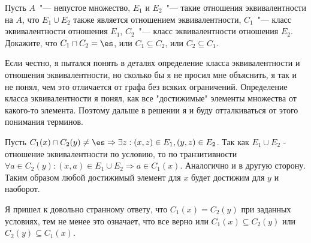 \documentclass[11pt]{article}
\begin{document}
	\p Пусть $A$~"--- непустое множество,  $E_1$ и $E_2$~"---  такие отношения эквивалентности на $A$, что $E_1\cup E_2$ также является отношением эквивалентности, $C_1$~"--- класс эквивалентности отношения $E_1$, $C_2$~"--- класс эквивалентности отношения $E_2$. Докажите, что $C_1\cap C_2 = \es$, или $C_1\subseteq C_2$, или $C_2\subseteq C_1$.
	
	Если честно, я пытался понять в деталях определение класса эквивалентности и отношения эквивалентности, но сколько бы я не просил мне объяснить, я так и не понял, чем это отличается от графа без всяких ограничений. Определение класса эквивалентности я понял, как все "достижимые" \space элементы множества от какого-то элемента. Поэтому дальше в решении я и буду отталкиваться от этого понимания терминов. 
	 
	Пусть $C_1(x) \cap C_2(y) \neq \es \Rightarrow \exists z: (x, z) \in E_1, (y, z) \in E_2$. Так как $E_1 \cup E_2$ - отношение эквивалентности по условию, то по транзитивности $\forall a \in C_2(y): (x, a) \in E_1 \cup E_2 \Rightarrow a \in C_1(x)$. Аналогично и в другую сторону. Таким образом любой достижимый элемент для $x$ будет достижим для $y$ и наоборот. 
	
	Я пришел к довольно странному ответу, что $C_1(x) = C_2(y)$ при заданных условиях, тем не менее это означает, что все верно или $C_1(x) \subseteq C_2(y)$ или $C_2(y) \subseteq C_1(x)$. 
\end{document}

